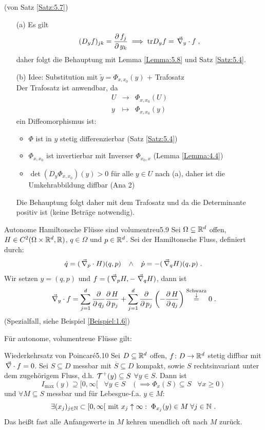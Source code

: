 \documentclass[a4paper]{article}
\begin{document}
\begin{Beweis}
(von Satz \ref{Satz:5.7})
\begin{itemize}
\item[(a)]
Es gilt
\[(D_yf)_{jk}=\frac{\operatorname{\partial} f_j}{\operatorname{\partial} y_k}\implies \textrm{tr} D_yf=\mathop{}\Vec{\nabla}_y\cdot f\;,\]
daher folgt die Behauptung mit Lemma \ref{Lemma:5.8} und Satz \ref{Satz:5.4}.
\item[(b)] Idee: Substitution mit $\tilde{y}=\Phi_{x,x_0}(y)$ + Trafosatz\\
Der Trafosatz ist anwendbar, da
\[\begin{array}{clc}
U&\to&\Phi_{x,x_0}(U)\\
y&\mapsto&\Phi_{x,x_0}(y)
\end{array}\]
ein Diffeomorphismus ist:
\begin{itemize}
\item $\Phi$ ist in $y$ stetig differenzierbar (Satz \ref{Satz:5.4})
\item $\Phi_{x,x_0}$ ist invertierbar mit Inverser $\Phi_{x_0,x}$ (Lemma \ref{Lemma:4.4})
\item $\det(D_y\Phi_{x,x_0})(y)>0$ für alle $y\in U$ nach (a), daher ist die Umkehrabbildung diffbar (Ana 2)
\end{itemize}
Die Behauptung folgt daher mit dem Trafosatz und da die Determinante positiv ist (keine Beträge notwendig).
\end{itemize}
\end{Beweis}

\begin{Beispiel}{Autonome Hamiltonsche Flüsse sind volumentreu}{5.9}
Sei $\Omega\subseteq \mathbb R^d$ offen, $H\in C^2(\Omega\times \mathbb R^d,\mathbb R)$, $q\in\Omega$ und $p\in \mathbb R^d$. Sei der Hamiltonsche Fluss, definiert durch:
\[\dot{q}=(\mathop{}\Vec{\nabla}_p\cdot H)(q,p)\;\;\;\wedge\;\;\; \dot{p}=-(\mathop{}\Vec{\nabla}_q H)(q,p)\;.\]
Wir setzen $y=(q,p)$ und $f=(\mathop{}\Vec{\nabla}_p H,-\mathop{}\Vec{\nabla}_q H)$, dann ist
\[\mathop{}\Vec{\nabla}_y\cdot f=\sum_{j=1}^d\frac{\operatorname{\partial}}{\operatorname{\partial} q_j}\frac{\operatorname{\partial} H}{\operatorname{\partial} p_j}+\sum_{j=1}^d\frac{\operatorname{\partial}}{\operatorname{\partial} p_j}\left(-\frac{\operatorname{\partial} H}{\operatorname{\partial} q_j}\right)\overset{\substack{\text{Schwarz}\\\downarrow}}{=}0\;.\]
(Spezialfall, siehe Beispiel \ref{Beispiel:1.6})
\end{Beispiel}

Für autonome, volumentreue Flüsse gilt:

\begin{Satz}{Wiederkehrsatz von Poincar\'e}{5.10}
Sei $D\subseteq\mathbb R^d$ offen, $f\colon D\to\mathbb R^d$ stetig diffbar mit $\mathop{}\Vec{\nabla}\cdot f=0$. Sei $S\subseteq D$ messbar mit $\overline{S}\subseteq D$ kompakt, sowie $S$ rechtsinvariant unter dem zugehörigem Fluss, d.h. $\operatorname{\mathcal{T}}^+(y)\subseteq S$ $\forall y\in S$. Dann ist 
\[I_{\max}(y)\supseteq [0,\infty[\;\;\;\forall y\in S\;\;\;(\implies \Phi_x(S)\subseteq S\;\;\;\forall x\ge0)\]
und $\forall M\subseteq S$ messbar und für Lebesgue-f.a. $y\in M$:
\[\exists (x_j)_{j\in\operatorname{\mathbb N}}\subset[0,\infty[\text{ mit }x_j\uparrow \infty :\; \Phi_{x_j}(y)\in M\;\forall j\in\operatorname{\mathbb N}\,.\]
Das heißt fast alle Anfangswerte in $M$ kehren unendlich oft nach $M$ zurück.
\end{Satz}
\end{document}
